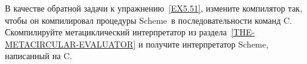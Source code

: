 \begin{exercise}{5.52}\label{EX5.52}%
%
В качестве обратной  задачи к
упражнению~\ref{EX5.51}, измените компилятор так, чтобы он
компилировал процедуры Scheme~в последовательности команд C.  Скомпилируйте
метациклический интерпретатор из 
раздела~\ref{THE-METACIRCULAR-EVALUATOR} и получите
интерпретатор Scheme, написанный на C.
\end{exercise}
